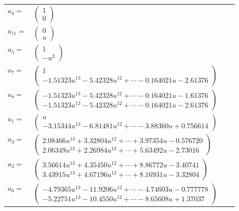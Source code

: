 \documentclass[1p]{elsarticle_modified}
\theoremstyle{definition}
\begin{document}
\begin{tabular}{m{7pt} m{180pt} m{7pt} m{180pt} }
\flushright $a_{4}=$&$\begin{pmatrix}1\\0\end{pmatrix}$ \\
\flushright $a_{11}=$&$\begin{pmatrix}0\\u\end{pmatrix}$ \\
\flushright $a_{5}=$&$\begin{pmatrix}1\\- u^2\end{pmatrix}$ \\
\flushright $a_{7}=$&$\begin{pmatrix}1\\-1.51323 u^{13}-5.42328 u^{12}+\cdots-0.164021 u-2.61376\end{pmatrix}$ \\
\flushright $a_{8}=$&$\begin{pmatrix}-1.51323 u^{13}-5.42328 u^{12}+\cdots-0.164021 u-1.61376\\-1.51323 u^{13}-5.42328 u^{12}+\cdots-0.164021 u-2.61376\end{pmatrix}$ \\
\flushright $a_{1}=$&$\begin{pmatrix}u\\-3.15344 u^{13}-6.81481 u^{12}+\cdots-3.88360 u+0.756614\end{pmatrix}$ \\
\flushright $a_{3}=$&$\begin{pmatrix}2.08466 u^{13}+3.32804 u^{12}+\cdots+3.97354 u-0.576720\\2.06349 u^{13}+2.26984 u^{12}+\cdots+5.63492 u-2.73016\end{pmatrix}$ \\
\flushright $a_{2}=$&$\begin{pmatrix}3.56614 u^{13}+4.35450 u^{12}+\cdots+8.86772 u-3.40741\\3.43915 u^{13}+4.67196 u^{12}+\cdots+8.16931 u-3.32804\end{pmatrix}$ \\
\flushright $a_{6}=$&$\begin{pmatrix}-4.79365 u^{13}-11.9206 u^{12}+\cdots-4.74603 u-0.777778\\-5.22751 u^{13}-10.4550 u^{12}+\cdots-8.65608 u+1.37037\end{pmatrix}$ \\

\end{tabular}
\end{document}
